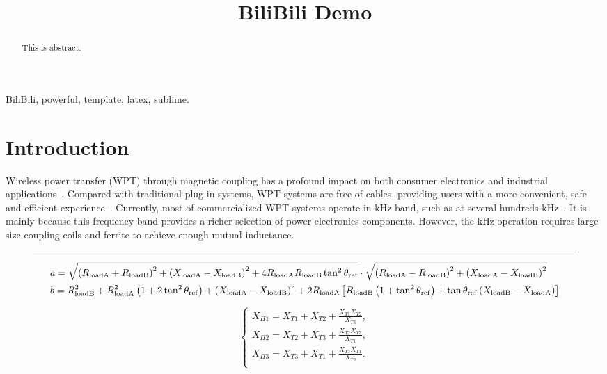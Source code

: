 \documentclass[conference]{IEEEtran}
\def\hrulefill{\leavevmode\leaders\hrule height 0.8pt\hfill\kern0pt}
\begin{document}
\title{BiliBili Demo}

\author
{
	}
\maketitle


\begin{abstract}
This is abstract.
\end{abstract}

\begin{IEEEkeywords}
BiliBili, powerful, template, latex, sublime.

\end{IEEEkeywords}

\section{Introduction}
Wireless power transfer (WPT) through magnetic coupling has a profound impact on both consumer electronics and industrial applications~\cite{jang2003contactless}. Compared with traditional plug-in systems, WPT systems are free of cables, providing users with a more convenient, safe and efficient experience~\cite{liu2020high}. Currently, most of commercialized WPT systems operate in kHz band, such as at several hundreds kHz~\cite{li20163}. It is mainly because this frequency band provides a richer selection of power electronics components. However, the kHz operation requires large-size coupling coils and ferrite to achieve enough mutual inductance.
\begin{figure*}[hb]
	\hrulefill
	\begin{align}
	\begin{split}
&a=\sqrt{\left( R_{\rm loadA}+R_{\rm loadB} \right) ^2+\left( X_{\rm loadA}-X_{\rm loadB} \right) ^2+4R_{\rm loadA}R_{\rm loadB}\tan ^2\theta _{\rm ref}}\cdot \sqrt{\left( R_{\rm loadA}-R_{\rm loadB} \right) ^2+\left( X_{\rm loadA}-X_{\rm loadB} \right) ^2}
\\
&b=R_{\rm loadB}^{2}+R_{\rm loadA}^{2}\left( 1+2\tan ^2\theta _{\rm ref} \right) +\left( X_{\rm loadA}-X_{\rm loadB} \right) ^2+2R_{\rm loadA}\left[ R_{\rm loadB}\left( 1+\tan ^2\theta _{\rm ref} \right) +\tan \theta _{\rm ref}\left( X_{\rm loadB}-X_{\rm loadA} \right) \right] 
	\end{split}
	\label{int}
	\end{align}
\end{figure*}
\begin{equation}
\begin{cases}
X_{\Pi 1}=X_{T1}+X_{T2}+\frac{X_{T1}X_{T2}}{X_{T3}},\\
X_{\Pi 2}=X_{T2}+X_{T3}+\frac{X_{T2}X_{T3}}{X_{T1}},\\
X_{\Pi 3}=X_{T3}+X_{T1}+\frac{X_{T3}X_{T1}}{X_{T2}}.\\
\end{cases}
\label{T2Pi}
\end{equation}
\end{document}
